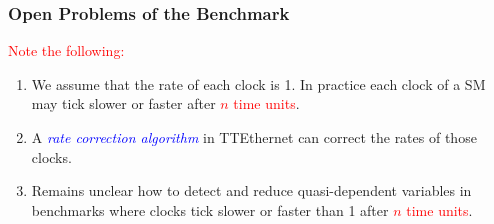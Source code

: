 \documentclass[serif]{beamer}
\begin{document}
\begin{frame}\frametitle{\textbf{Open Problems of the Benchmark}}
\textcolor{red}{Note the following:}  
\begin{enumerate}
\item We assume that the rate of each clock is 1. In practice each clock of a SM 
			may tick slower or faster after \textcolor{red}{$n$ time units}.
\item A \emph{\textcolor{blue}{rate correction algorithm}} in TTEthernet can correct the rates of those clocks.
\item Remains unclear how to detect and reduce quasi-dependent variables in
			benchmarks where clocks tick slower or faster than 1 after \textcolor{red}{$n$ time units}. 
\end{enumerate}
\end{frame}

\begin{frame}\frametitle{}
\end{frame}
\end{document}
